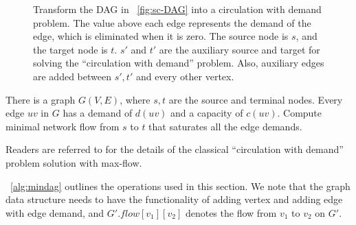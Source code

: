 \begin{figure*}[h!]
    \caption[Transform the DAG in ~\ref{fig:sc-DAG} into a circulation with demand problem]
    {Transform the DAG in ~\ref{fig:sc-DAG} into a circulation with demand problem. 
    The value above each edge represents the demand of the edge, which is eliminated when it is zero.
    The source node is $s$, and the target node is $t$. $s'$ and $t'$ are the auxiliary source and target for solving the ``circulation with demand'' problem.
    Also, auxiliary edges are added between $s', t'$ and every other vertex.}
    \label{fig:sc-flow}
\end{figure*}


\begin{problem}
There is a graph $G(V,E)$, where $s,t$ are the source and terminal nodes. 
Every edge $uv$ in $G$ has a demand of $d(uv)$ and a capacity of $c(uv)$. 
Compute minimal network flow from $s$ to $t$ that saturates all the edge 
demands.
\end{problem}

Readers are referred to \cite{kleinberg2006algorithm} for %
the details of the classical ``circulation with demand'' problem solution with max-flow. 

~\ref{alg:mindag} outlines the operations
used in this section. We note that the 
graph data structure needs to have the functionality of adding vertex and adding 
edge with edge demand, and $G'.flow[v_1][v_2]$ denotes the flow from $v_1$ to $v_2$ on $G'$.

